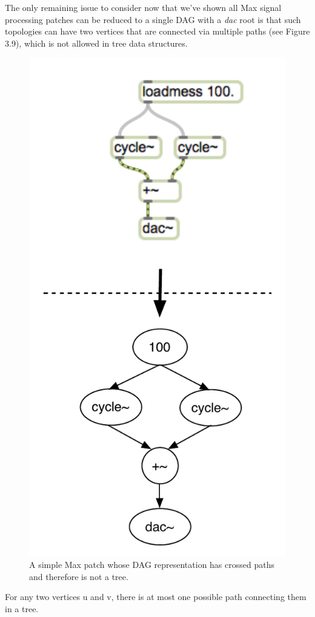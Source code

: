 \documentclass[12pt]{report} 	%
\numberwithin{figure}{chapter}
\numberwithin{table}{chapter}
\numberwithin{equation}{chapter}
\begin{document}
\begin{flushleft}
The only remaining issue to consider now that we've shown all Max signal processing patches can be reduced to a single DAG with a \textit{dac\texttildelow{}} root is that such topologies can  have two vertices that are connected via multiple paths (see Figure 3.9), which is not allowed in tree data structures.
\begin{figure}[h!]
\begin{center}
\includegraphics[scale=0.8]{MaxDAGsCrossedPaths}
\caption[A DAG with crossed paths]{A simple Max patch whose DAG representation has crossed paths and therefore is not a tree.}
\end{center}
\end{figure}
For any two vertices u and v, there is at most one possible path connecting them in a tree. 


\end{flushleft}
\end{document}
